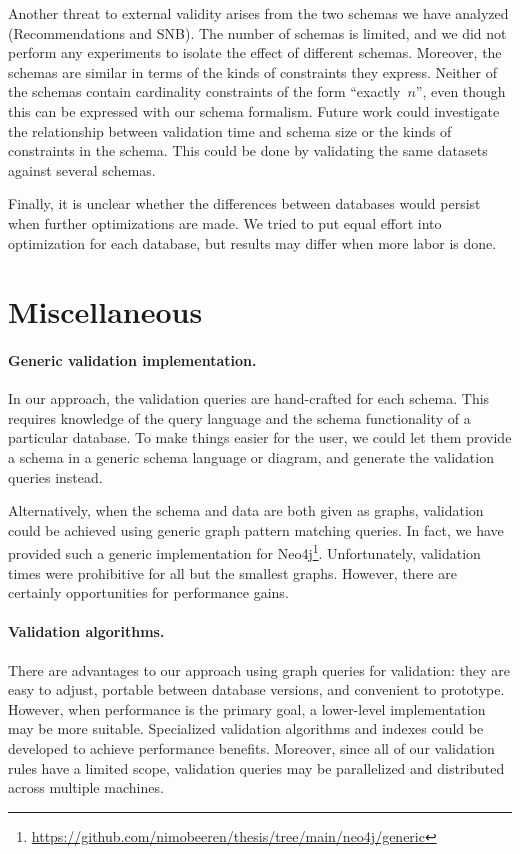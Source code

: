 \documentclass{report}
\theoremstyle{definition}
\begin{document}
Another threat to external validity arises from the two schemas we have analyzed (Recommendations and SNB). The number of schemas is limited, and we did not perform any experiments to isolate the effect of different schemas. Moreover, the schemas are similar in terms of the kinds of constraints they express. Neither of the schemas contain cardinality constraints of the form ``exactly~$n$'', even though this can be expressed with our schema formalism. Future work could investigate the relationship between validation time and schema size or the kinds of constraints in the schema. This could be done by validating the same datasets against several schemas.

Finally, it is unclear whether the differences between databases would persist when further optimizations are made. We tried to put equal effort into optimization for each database, but results may differ when more labor is done.

\section{Miscellaneous}

\paragraph{Generic validation implementation.} In our approach, the validation queries are hand-crafted for each schema. This requires knowledge of the query language and the schema functionality of a particular database. To make things easier for the user, we could let them provide a schema in a generic schema language or diagram, and generate the validation queries instead.

Alternatively, when the schema and data are both given as graphs, validation could be achieved using generic graph pattern matching queries. In fact, we have provided such a generic implementation for Neo4j\footnote{\url{https://github.com/nimobeeren/thesis/tree/main/neo4j/generic}}. Unfortunately, validation times were prohibitive for all but the smallest graphs. However, there are certainly opportunities for performance gains.

\paragraph{Validation algorithms.} There are advantages to our approach using graph queries for validation: they are easy to adjust, portable between database versions, and convenient to prototype. However, when performance is the primary goal, a lower-level implementation may be more suitable. Specialized validation algorithms and indexes could be developed to achieve performance benefits. Moreover, since all of our validation rules have a limited scope, validation queries may be parallelized and distributed across multiple machines.
\end{document}
